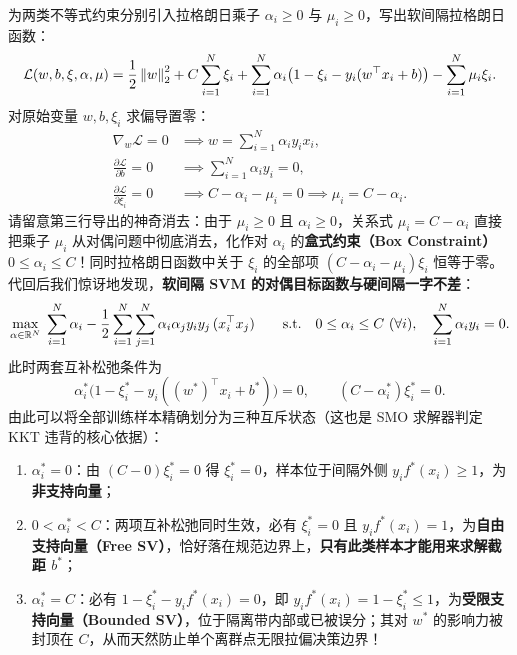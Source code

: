 为两类不等式约束分别引入拉格朗日乘子 $\alpha_i \ge 0$ 与 $\mu_i \ge 0$，写出软间隔拉格朗日函数：
\[
  \mathcal{L}(w, b, \xi, \alpha, \mu)
  = \frac{1}{2}\left\|w\right\|_2^2 + C\sum_{i=1}^{N}\xi_i
  + \sum_{i=1}^{N}\alpha_i\big(1 - \xi_i - y_i(w^\top x_i + b)\big) - \sum_{i=1}^{N}\mu_i \xi_i.
\]
对原始变量 $w, b, \xi_i$ 求偏导置零：
\begin{align*}
  \nabla_w \mathcal{L} = 0 &\implies w = \sum_{i=1}^{N}\alpha_i y_i x_i, \\
  \frac{\partial \mathcal{L}}{\partial b} = 0 &\implies \sum_{i=1}^{N}\alpha_i y_i = 0, \\
  \frac{\partial \mathcal{L}}{\partial \xi_i} = 0 &\implies C - \alpha_i - \mu_i = 0 \implies \mu_i = C - \alpha_i.
\end{align*}
请留意第三行导出的神奇消去：由于 $\mu_i \ge 0$ 且 $\alpha_i \ge 0$，关系式 $\mu_i = C - \alpha_i$ 直接把乘子 $\mu_i$ 从对偶问题中彻底消去，化作对 $\alpha_i$ 的\textbf{盒式约束（Box Constraint）} $0 \le \alpha_i \le C$！同时拉格朗日函数中关于 $\xi_i$ 的全部项 $(C - \alpha_i - \mu_i)\xi_i$ 恒等于零。代回后我们惊讶地发现，\textbf{软间隔 SVM 的对偶目标函数与硬间隔一字不差}：
\begin{equation}\label{eq:svm-soft-dual}
  \max_{\alpha \in \mathbb{R}^N}\; \sum_{i=1}^{N} \alpha_i - \frac{1}{2}\sum_{i=1}^{N}\sum_{j=1}^{N} \alpha_i \alpha_j y_i y_j\, (x_i^\top x_j)
  \qquad \text{s.t.}\quad 0 \le \alpha_i \le C\ (\forall i),\quad \sum_{i=1}^{N} \alpha_i y_i = 0.
\end{equation}
此时两套互补松弛条件为
\[
  \alpha_i^*\big(1 - \xi_i^* - y_i((w^*)^\top x_i + b^*)\big) = 0, \qquad
  (C - \alpha_i^*)\xi_i^* = 0.
\]
由此可以将全部训练样本精确划分为三种互斥状态（这也是 SMO 求解器判定 KKT 违背的核心依据）：
\begin{enumerate}
  \item $\alpha_i^* = 0$：由 $(C - 0)\xi_i^* = 0$ 得 $\xi_i^* = 0$，样本位于间隔外侧 $y_i f^*(x_i) \ge 1$，为\textbf{非支持向量}；
  \item $0 < \alpha_i^* < C$：两项互补松弛同时生效，必有 $\xi_i^* = 0$ 且 $y_i f^*(x_i) = 1$，为\textbf{自由支持向量（Free SV）}，恰好落在规范边界上，\textbf{只有此类样本才能用来求解截距 $b^*$}；
  \item $\alpha_i^* = C$：必有 $1 - \xi_i^* - y_i f^*(x_i) = 0$，即 $y_i f^*(x_i) = 1 - \xi_i^* \le 1$，为\textbf{受限支持向量（Bounded SV）}，位于隔离带内部或已被误分；其对 $w^*$ 的影响力被封顶在 $C$，从而天然防止单个离群点无限拉偏决策边界！
\end{enumerate}

